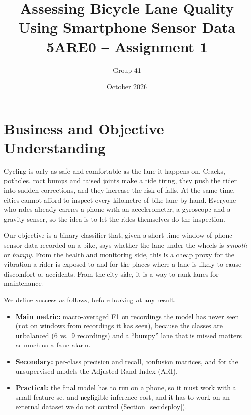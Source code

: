 \documentclass[10pt,a4paper]{article}
\title{\vspace{-1.2cm}\textbf{Assessing Bicycle Lane Quality Using Smartphone Sensor Data}\\[2pt]
\large 5ARE0 -- Assignment 1}
\author{Group 41\\
\small \tbd{names and student numbers of the three members}}
\date{\small October 2026}
\begin{document}
\maketitle
\vspace{-0.8cm}


\section{Business and Objective Understanding}

Cycling is only as safe and comfortable as the lane it happens on. Cracks, potholes, root bumps and raised joints make a ride tiring, they push the rider into sudden corrections, and they increase the risk of falls. At the same time, cities cannot afford to inspect every kilometre of bike lane by hand. Everyone who rides already carries a phone with an accelerometer, a gyroscope and a gravity sensor, so the idea is to let the rides themselves do the inspection.

Our objective is a binary classifier that, given a short time window of phone sensor data recorded on a bike, says whether the lane under the wheels is \emph{smooth} or \emph{bumpy}. From the health and monitoring side, this is a cheap proxy for the vibration a rider is exposed to and for the places where a lane is likely to cause discomfort or accidents. From the city side, it is a way to rank lanes for maintenance.

We define success as follows, before looking at any result:
\begin{itemize}
  \item \textbf{Main metric:} macro-averaged F1 on recordings the model has never seen (not on windows from recordings it has seen), because the classes are unbalanced (6 vs.\ 9 recordings) and a ``bumpy'' lane that is missed matters as much as a false alarm.
  \item \textbf{Secondary:} per-class precision and recall, confusion matrices, and for the unsupervised models the Adjusted Rand Index (ARI).
  \item \textbf{Practical:} the final model has to run on a phone, so it must work with a small feature set and negligible inference cost, and it has to work on an external dataset we do not control (Section~\ref{sec:deploy}).
\end{itemize}

\end{document}
